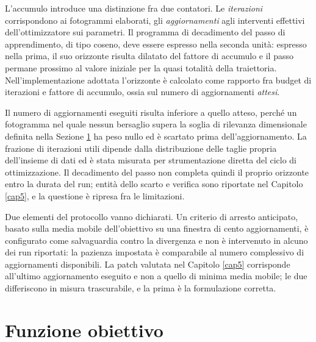 \documentclass[a4paper,12pt]{report}
\begin{document}
L'accumulo introduce una distinzione fra due contatori. Le \emph{iterazioni}
corrispondono ai fotogrammi elaborati, gli \emph{aggiornamenti} agli interventi
effettivi dell'ottimizzatore sui parametri. Il programma di decadimento del
passo di apprendimento, di tipo coseno, deve essere espresso nella seconda
unità: espresso nella prima, il suo orizzonte risulta dilatato del fattore di
accumulo e il passo permane prossimo al valore iniziale per la quasi totalità
della traiettoria. Nell'implementazione adottata l'orizzonte è calcolato come
rapporto fra budget di iterazioni e fattore di accumulo, ossia sul numero di
aggiornamenti \emph{attesi}.

Il numero di aggiornamenti eseguiti risulta inferiore a quello atteso, perché un
fotogramma nel quale nessun bersaglio supera la soglia di rilevanza dimensionale
definita nella Sezione \ref{sec:loss} ha peso nullo ed è scartato prima
dell'aggiornamento. La frazione di iterazioni utili dipende dalla distribuzione
delle taglie propria dell'insieme di dati ed è stata misurata per strumentazione
diretta del ciclo di ottimizzazione. Il decadimento del passo non completa
quindi il proprio orizzonte entro la durata del run; entità dello scarto e
verifica sono riportate nel Capitolo \ref{cap5}, e la questione è ripresa fra le
limitazioni.

Due elementi del protocollo vanno dichiarati. Un criterio di arresto anticipato,
basato sulla media mobile dell'obiettivo su una finestra di cento aggiornamenti,
è configurato come salvaguardia contro la divergenza e non è intervenuto in
alcuno dei run riportati: la pazienza impostata è comparabile al numero
complessivo di aggiornamenti disponibili. La patch valutata nel Capitolo
\ref{cap5} corrisponde all'ultimo aggiornamento eseguito e non a quello di
minima media mobile; le due differiscono in misura trascurabile, e la prima è la
formulazione corretta.

\section{Funzione obiettivo}
\label{sec:loss}
\end{document}
